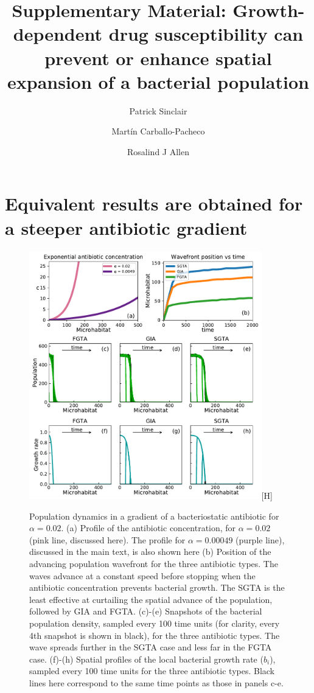 \documentclass[a4paper]{article}
\title{Supplementary Material: Growth-dependent drug susceptibility can prevent or enhance spatial expansion of a bacterial population}
\author{Patrick Sinclair}
\author{Mart\'{i}n Carballo-Pacheco}
\author{Rosalind J Allen}
\affil{School of Physics and Astronomy, University of Edinburgh,  Peter Guthrie Tait Road, Edinburgh, EH9 3FD, United Kingdom}
\date{}
\begin{document}
\maketitle

\section*{Equivalent results are obtained for a steeper antibiotic gradient}

\begin{figure}
\centering
\includegraphics[width=0.9\textwidth]{supplementary_figures_alpha_0_002-FINAL.pdf}[H]
\caption{Population dynamics in a gradient of a bacteriostatic antibiotic for $\alpha=0.02$. (a) Profile of the antibiotic concentration, for $\alpha=0.02$ (pink line, discussed here). The profile for $\alpha=0.00049$ (purple line), discussed in the main text, is also shown here (b) Position of the advancing population wavefront for the three antibiotic types. The waves advance at a constant speed before stopping when the antibiotic concentration prevents bacterial growth.  The SGTA is the least effective at curtailing the spatial advance of the population, followed by GIA and FGTA. (c)-(e) Snapshots of the bacterial population density, sampled every 100 time units (for clarity, every 4th snapshot is shown in black), for the three antibiotic types. The wave spreads further in the SGTA case and less far in the FGTA case. (f)-(h)  Spatial profiles of the local bacterial growth rate ($b_i$), sampled every 100 time units for the three antibiotic types. Black lines here correspond to the same time points as those in panels c-e.}\label{fig:supplementary-material}
\end{figure}
\end{document}
